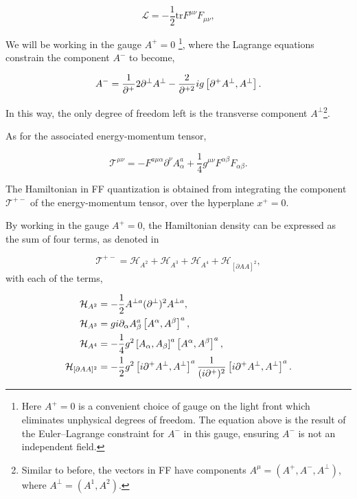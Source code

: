 \documentclass[11pt,a4paper,twoside,pdf]{article}
\numberwithin{equation}{section}
\begin{document}
\begin{equation}
    \mathcal{L} = -\frac{1}{2}\text{tr}F^{\mu\nu}F_{\mu\nu},
\end{equation}

We will be working in the gauge $A^+=0$ \footnote{Here $A^+ =0$ is a convenient choice of gauge on the light front which eliminates unphysical degrees of freedom. The equation above is the result of the Euler–Lagrange constraint for $A^-$ in this gauge, ensuring $A^-$ is not an independent field.}, where the Lagrange equations constrain
the component $A^-$ to become,

\begin{equation}
    A^- = \frac{1}{\partial^+}2 \partial^\perp A^\perp - \frac{2}{\partial^{+2}} ig 
    \left[ \partial^+ A^\perp, A^\perp \right].
\end{equation}

In this way, the only degree of freedom left is the transverse component $A^\perp$\footnote{Similar to before, the vectors in FF have components
$A^\mu = (A^+, A^-, A^\perp)$, where $A^\perp = (A^1, A^2)$.}.

As for the associated energy-momentum tensor,

\begin{equation}
    \mathcal{T}^{\mu\nu} = -F^{a\mu\alpha}\partial^\nu A^a_\alpha + 
    \frac{1}{4}g^{\mu\nu}F^{\alpha\beta} F_{\alpha\beta}.
\end{equation}

The Hamiltonian in FF quantization is obtained from integrating the component
$\mathcal{T}^{+-}$ of the energy-momentum tensor, over the hyperplane $x^+=0$. 

By working in the gauge $A^+=0$, the Hamiltonian density can be expressed as the sum of 
four terms, as denoted in \cite{glazek_dynamics_2001}

\begin{equation}
    \mathcal{T}^{+-} = \mathcal{H}_{A^2} + \mathcal{H}_{A^3} +
    \mathcal{H}_{A^4} + \mathcal{H}_{[\partial AA]^2},
\end{equation}
with each of the terms, 

\begin{align}
    \mathcal{H}_{A^2} &= -\frac{1}{2} A^{\perp a} (\partial^\perp)^2 A^{\perp a}, \\
    \mathcal{H}_{A^3} &= g i \partial_\alpha A^a_\beta \left[ A^\alpha, A^\beta \right]^a, \\
    \mathcal{H}_{A^4} &= -\frac{1}{4} g^2 \left[ A_\alpha, A_\beta \right]^a
    \left[ A^\alpha, A^\beta \right]^a, \\
    \mathcal{H}_{[\partial AA]^2} &= -\frac{1}{2} g^2 \left[ i \partial^+ A^\perp,
    A^\perp \right]^a  \frac{1}{(i\partial^+)^2} \left[ i\partial^+ A^\perp, A^\perp \right]^a.
\end{align}
\end{document}

